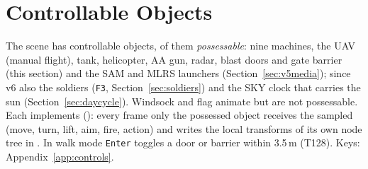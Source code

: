 \section{Controllable Objects}\label{sec:control}
The scene has \nControllables{} controllable objects, \nPossessable{} of them \emph{possessable}: nine machines, the UAV (manual flight), tank, helicopter, AA gun, radar, blast doors and gate barrier (this section) and the SAM and MLRS launchers (Section~\ref{sec:v5media}); since v6 also the \nSoldiers{} soldiers (\texttt{F3}, Section~\ref{sec:soldiers}) and the SKY clock that carries the sun (Section~\ref{sec:daycycle}). Windsock and flag animate but are not possessable. Each implements  (): every frame only the possessed object receives the sampled  (move, turn, lift, aim, fire, action) and writes the local transforms of its own node tree in . In walk mode \texttt{Enter} toggles a door or barrier within 3.5\,m (T128). Keys: Appendix~\ref{app:controls}.

